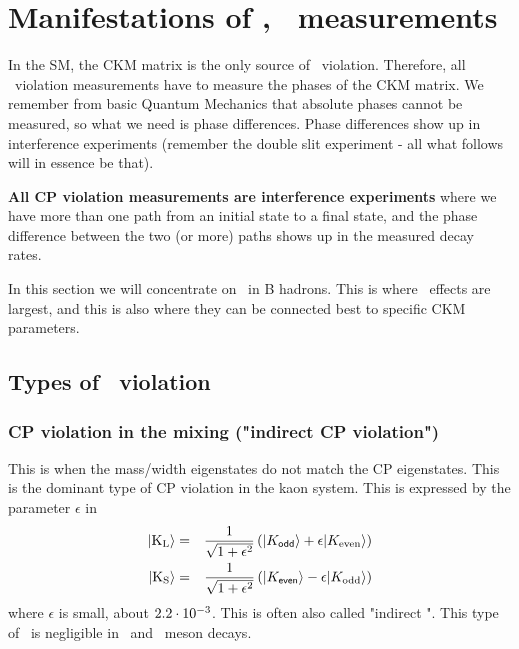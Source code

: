\section{Manifestations of \cpv, \cpv\ measurements}
\label{sec:CPVinB}
 In the SM, the CKM matrix is the only source of \cp\ violation. Therefore, all \cp\ violation measurements have to measure the phases of the CKM
 matrix. We remember from basic Quantum Mechanics that absolute phases
 cannot be measured, so what we need is phase differences. Phase
 differences show up in interference experiments (remember the double
 slit experiment - all what follows will in essence be that).

 \textbf{All CP violation measurements are interference experiments}
 where we have more than one path from an initial state to a final state, and the
 phase difference between the two (or more) paths shows up in the measured decay
 rates.
 
 
 In this section we will concentrate on \cpv\ in B hadrons. This is where \cpv\ effects are largest, and this is also where they can be connected best to specific CKM parameters.
 
\subsection{Types of \cp\ violation}

\subsubsection{CP violation in the mixing ("indirect CP violation")}
This is when the mass/width eigenstates do not match the CP eigenstates.
This is the dominant type of CP violation in the kaon system. This is expressed by the parameter $\epsilon$ in 
\begin{eqnarray}
 | {\rm K_L} \rangle &=& \frac{1}{\sqrt{1 + \epsilon^2}} \left(
              | K_{\mathsf{odd}} \rangle + \epsilon  | K_{\mathrm{even}} \rangle \right)
             \nonumber\\
 | {\rm K_S} \rangle &=& \frac{1}{\sqrt{1 + \epsilon^2}} \left(
              | K_{\mathsf{even}} \rangle - \epsilon  | K_{\mathrm{odd}} \rangle \right)
\end{eqnarray}
where $\epsilon$ is small, about $2.2\cdot 10^{-3}$.
This is often also called "indirect \cpv". This type of \cpv\ is negligible in \Bdo\ and \Bso\ meson decays.

